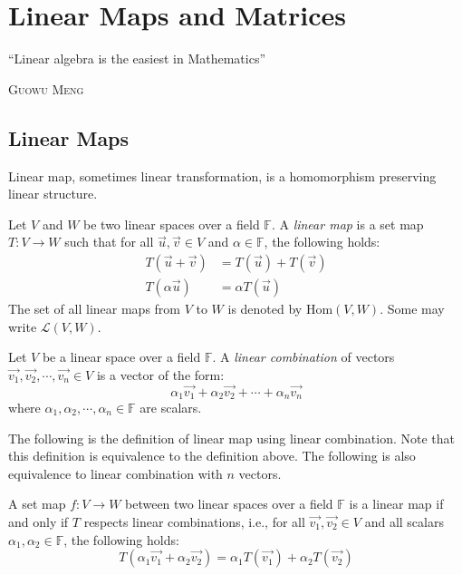 \documentclass[
	11pt, %
	fleqn, %
	a4paper, %
]{LegrandOrangeBook}
\newcommand{\Hom}{\text{Hom}} %
\newcommand{\F}{\mathbb{F}} %
\let\originalepigraph\epigraph
\renewcommand\epigraph[2]{\originalepigraph{#1}{\textsc{#2}}}
\begin{document}

\chapter{Linear Maps and Matrices}

\epigraph{``Linear algebra is the easiest in Mathematics''}{Guowu Meng}

\section{Linear Maps}

Linear map, sometimes linear transformation, is a homomorphism preserving linear structure.

\begin{definition}
    Let $V$ and $W$ be two linear spaces over a field $\F$. A \emph{linear map} is a set map $T: V \to W$ such that for all $\vec{u}, \vec{v} \in V$ and $\alpha \in \F$, the following holds:
    \[
        \begin{split}
            T(\vec{u} + \vec{v}) &= T(\vec{u}) + T(\vec{v}) \\
            T(\alpha \vec{u}) &= \alpha T(\vec{u})
        \end{split}
    \]
    The set of all linear maps from $V$ to $W$ is denoted by $\Hom(V, W)$. Some may write {$\mathcal{L}(V, W)$}.
\end{definition}

\begin{definition}
    Let $V$ be a linear space over a field $\F$. A \emph{linear combination} of vectors $\vec{v_1}, \vec{v_2}, \cdots, \vec{v_n} \in V$ is a vector of the form:
    \[
        \alpha_1 \vec{v_1} + \alpha_2 \vec{v_2} + \cdots + \alpha_n \vec{v_n}
    \]
    where $\alpha_1, \alpha_2, \cdots, \alpha_n \in \F$ are scalars.
\end{definition}

The following is the definition of linear map using linear combination. Note that this definition is equivalence to the definition above. The following is also equivalence to linear combination with $n$ vectors.

\begin{corollary}
    A set map $f: V \to W$ between two linear spaces over a field $\F$ is a linear map if and only if $T$ respects linear combinations, i.e., for all $\vec{v_1}, \vec{v_2} \in V$ and all scalars $\alpha_1, \alpha_2 \in \F$, the following holds:
    \[
        T(\alpha_1 \vec{v_1} + \alpha_2 \vec{v_2}) = \alpha_1 T(\vec{v_1}) + \alpha_2 T(\vec{v_2})
    \]
\end{corollary}
\end{document}

